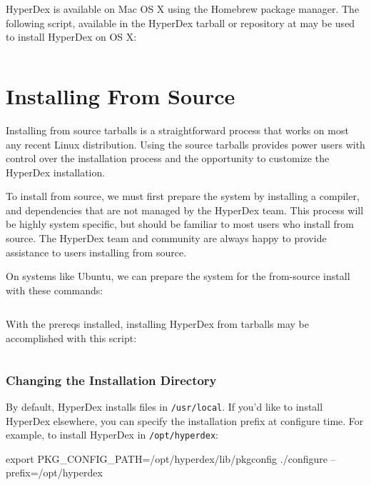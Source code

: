 HyperDex is available on Mac OS X using the Homebrew package manager.  The
following script, available in the HyperDex tarball or repository at
 may be used to install HyperDex on OS X:

\inputminted[frame=lines,framesep=2mm,firstline=3]{bash}{\topdir/install/homebrew.sh}

\section{Installing From Source}

Installing from source tarballs is a straightforward process that works on most
any recent Linux distribution.  Using the source tarballs provides power users
with control over the installation process and the opportunity to customize
the HyperDex installation.

To install from source, we must first prepare the system by installing a
compiler, and dependencies that are not managed by the HyperDex team.  This
process will be highly system specific, but should be familiar to most users who
install from source.  The HyperDex team and community are always happy to
provide assistance to users installing from source.

On systems like Ubuntu, we can prepare the system for the from-source install
with these commands:

\inputminted[frame=lines,framesep=2mm,firstline=3]{bash}{\topdir/install/ubuntu14.04-source-prereqs.sh}

With the prereqs installed, installing HyperDex from tarballs may be
accomplished with this script:

\inputminted[frame=lines,framesep=2mm,firstline=5]{bash}{\topdir/install/source-install.sh}

\subsubsection{Changing the Installation Directory}
\label{sec:installation:source:prefix}

By default, HyperDex installs files in \texttt{/usr/local}.  If you'd like to
install HyperDex elsewhere, you can specify the installation prefix at configure
time.  For example, to install HyperDex in \texttt{/opt/hyperdex}:

\begin{consolecode}
export PKG_CONFIG_PATH=/opt/hyperdex/lib/pkgconfig
./configure --prefix=/opt/hyperdex
\end{consolecode}

